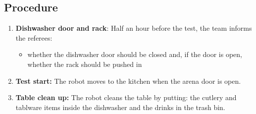 \subsection*{Procedure}
\begin{enumerate}[nosep]
	\item \textbf{Dishwasher door and rack}: Half an hour before the test, the team informs the referees:
		\begin{itemize}
			\item whether the dishwasher door should be closed and, if the door is open, whether the rack should be pushed in
		\end{itemize}
	\item \textbf{Test start:} The robot moves to the kitchen when the arena door is open.
	\item \textbf{Table clean up:} The robot cleans the table by putting: the cutlery and tablware items inside the dishwasher and the drinks in the trash bin.
\end{enumerate}


